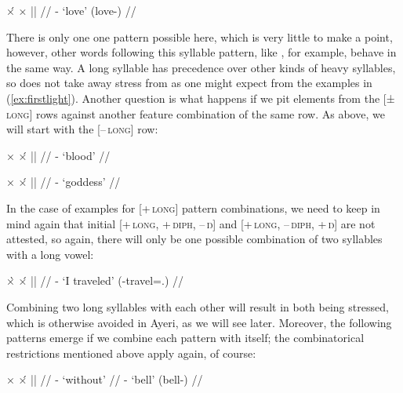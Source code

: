 \ex[everygla=\upshape]
\begingl
	\gla ×́		{}	×		||	{} //
	\glb {}	-		{}
		{`love' (love-\Aarg{})} //
\endgl
\xe

There is only one one pattern possible here, which is very little to make a 
point, however, other words following this syllable pattern, like 
, for example, behave in the same way. A long 
syllable has precedence over other kinds of heavy syllables, so 
 does not take away stress from  as one 
might expect from the examples in (\ref{ex:firstlight}). Another question is 
what happens if we pit elements from the \textsc{[±\,long]} rows against another 
feature combination of the same row. As above, we will start with the 
\textsc{[–\,long]} row:

\pex[everygla=\upshape]\label{-l-l}
\a\begingl
	\gla ×		{}	×́		||	{} //
	\glb {}	-		{}	{`blood'} //
\endgl

\a\begingl
	\gla ×		{}	×́		||	{} //
	\glb {}	-		{}	{`goddess'} //
\endgl
\xe

In the case of examples for \textsc{[+\,long]} pattern combinations, we need to 
keep in mind again that initial \textsc{[+\,long, +\,diph, –\,ŋ]} and 
\textsc{[+\,long, –\,diph, +\,ŋ]} are not attested, so again, there will only 
be one possible combination of two syllables with a long vowel:

\ex[everygla=\upshape]\label{+l+l}
\begingl
	\gla ×̀		{}	×́		||	{} //
	\glb {}	-		{}	{`I traveled' 
		(\Pst{}-travel=\Fsg.\Top{})} //
\endgl
\xe

Combining two long syllables with each other will result in both being stressed,
which is otherwise avoided in Ayeri, as we will see later. Moreover, the 
following patterns emerge if we combine each pattern with itself; the 
combinatorical restrictions mentioned above apply again, of course:

\pex[everygla=\upshape]
\a\begingl
	\gla ×		{}	×́		||	{} //
	\glb {}	-		{}	{`without'} //
	\glb {}	-		{}	{`bell' 
		(bell-\AargI{})} //
\endgl

